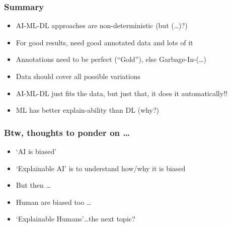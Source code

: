\begin{frame}[fragile]\frametitle{Summary}
\begin{itemize}
\item AI-ML-DL approaches are non-deterministic (but (\ldots)?)
\item For good results, need good annotated data and lots of it
\item Annotations need to be perfect (``Gold''), else Garbage-In-(\ldots)
\item Data should cover all possible variations
\item AI-ML-DL just fits the data, but just that, it does it automatically!!
\item ML has better explain-ability than DL (why?)
\end{itemize}
\end{frame}

\begin{frame}[fragile]\frametitle{Btw, thoughts to ponder on \ldots}
\begin{itemize}
\item ‘AI is biased'
\item ‘Explainable AI' is to understand how/why it is biased
\item But then \ldots
\item Human are biased too \ldots
\item ‘Explainable Humans'\ldots the next topic?
\end{itemize}
\end{frame}
